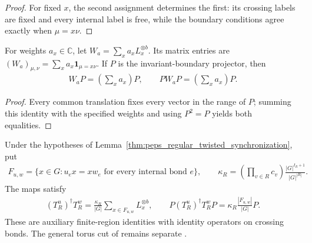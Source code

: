 \begin{proof}\leanok
    For fixed $x$, the second assignment determines the first: its crossing
    labels are fixed and every internal label is free, while the boundary conditions
    agree exactly when $\mu=x\nu$.
\end{proof}

\begin{lemma}%
    \label{thm:peps_regular_weighted_boundary_translation}
    \leanok
    For weights $a_x\in\mathbb C$, let
    $W_a=\sum_x a_x L_x^{\otimes b}$. Its matrix entries are
    $(W_a)_{\mu,\nu}=\sum_x a_x\mathbf{1}_{\mu=x\nu}$.
    If $P$ is the invariant-boundary projector, then
    \begin{align}
        W_aP=\left(\sum_xa_x\right)P,
        \qquad PW_aP=\left(\sum_xa_x\right)P.
    \end{align}
\end{lemma}

\begin{proof}\leanok
    Every common translation fixes every vector in the range of $P$;
    summing this identity with the specified weights and using $P^2=P$ yields both equalities.
\end{proof}

\begin{lemma}%
    \label{thm:peps_regular_twisted_region_cross_gram}
    \leanok
    Under the hypotheses of
    Lemma~\ref{thm:peps_regular_twisted_synchronization}, put
    \begin{align}
        F_{u,w}=\{x\in G:u_ex=xw_e\text{ for every internal bond }e\},
        \qquad
        \kappa_R=\left(\prod_{v\in R}c_v\right)
        \frac{|G|^{I_R+1}}{|G|^{|R|}}.
    \end{align}
    The maps satisfy
    \begin{align}
        (T_R^u)^\dagger T_R^w
        =\frac{\kappa_R}{|G|}\sum_{x\in F_{u,w}}L_x^{\otimes b},
        \qquad
        P(T_R^u)^\dagger T_R^wP
        =\kappa_R\frac{|F_{u,w}|}{|G|}P.
    \end{align}
    These are auxiliary finite-region identities with identity operators
    on crossing bonds. The general torus cut of
    \cite[Theorem~6.9]{Schuch2010PEPS} remains separate
    \cite{gap:rmp_peps_quantum_double_g_isometry}.
\end{lemma}

